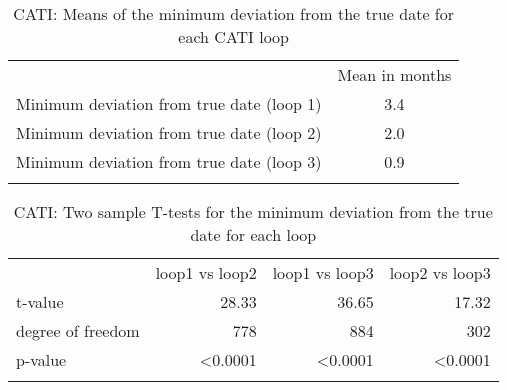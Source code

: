\begin{table}[h]
	\centering
	\caption{CATI: Means of the minimum deviation from the true date for each CATI loop}
	\label{tab:mean_dates_cati}
	\begin{tabularx}{\textwidth}{Xc}\addlinespace
		
		&Mean in months            \\\addlinespace
		\midrule \addlinespace
		Minimum deviation from true date (loop 1)      &   3.4  \\ \addlinespace
		Minimum deviation from true date (loop 2)  & 2.0 \\\addlinespace
		Minimum deviation from true date (loop 3)  & 0.9\\\addlinespace
		\bottomrule                         
	\end{tabularx}
\end{table}


\begin{table}[h]
	\centering
	\caption{CATI: Two sample T-tests for the minimum deviation from the true date for each loop}
	\label{tab:t-test_date}
	\begin{tabularx}{\textwidth}{Xrrr}\addlinespace
		&loop1 vs loop2 &  loop1 vs loop3 &  loop2 vs loop3              \\ \addlinespace
		\midrule \addlinespace
		t-value& 28.33&36.65&17.32 \\ \addlinespace
		degree of freedom&778&884&302 \\ \addlinespace
		p-value&\textless0.0001&\textless0.0001&\textless0.0001 \\ \addlinespace
		\bottomrule                         
	\end{tabularx}
\end{table}

